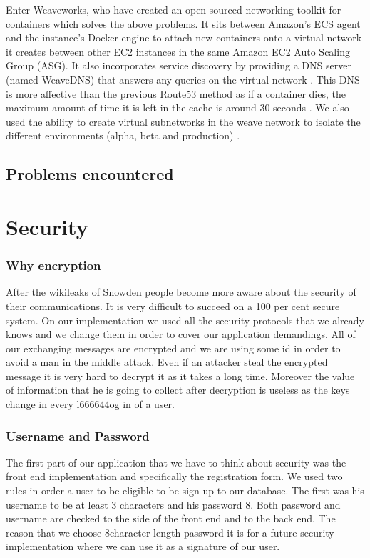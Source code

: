 \documentclass[11pt,a4paper]{report}
\begin{document}
Enter Weaveworks, who have created an open-sourced networking toolkit for containers which solves the above problems. It sits between Amazon's ECS agent and the instance's Docker engine to attach new containers onto a virtual network it creates between other EC2 instances in the same Amazon EC2 Auto Scaling Group (ASG). It also incorporates service discovery by providing a DNS server (named WeaveDNS) that answers any queries on the virtual network \cite{website:weave_dns}. This DNS is more affective than the previous Route53 method as if a container dies, the maximum amount of time it is left in the cache is around 30 seconds \cite{website:weave_dns_fault_tolerance}. We also used the ability to create virtual subnetworks in the weave network to isolate the different environments (alpha, beta and production) \cite{website:weave_subnet_allocation}.


\subsection{Problems encountered}



\section{Security}
\subsubsection{Why encryption}
After the wikileaks of Snowden people become more aware about the security of their communications. It is very difficult to succeed on a 100 per cent secure system. On our implementation we used all the security protocols that we already knows and we change them in order to cover our application demandings. All of our exchanging messages are encrypted and we are using some id in order to avoid a man in the middle attack. Even if an attacker steal the encrypted message it is very hard to decrypt it as it takes a long time. Moreover the value of information that he is going to collect after decryption is useless as the keys change in every l666644og in of a user.
\subsubsection{Username and Password}
The first part of our application that we have to think about security was the front end implementation and specifically the registration form. We used two rules in order a user to be eligible to be sign up to our database. The first was his username to be at least 3 characters and his password 8. Both password and username are checked to the side of the front end and to the back end. The reason that we choose 8character length password it is for a future security implementation where we can use it as a signature of our user.
\end{document}
